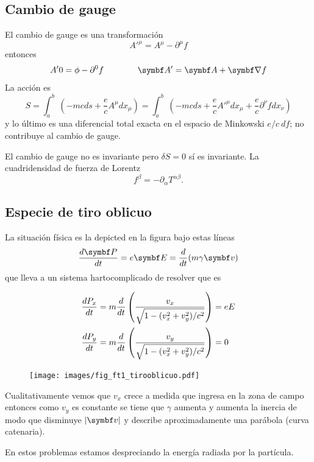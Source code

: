\documentclass[10pt,oneside]{CBFT_book}
\begin{document}
\subsection{Cambio de gauge}

El cambio de gauge es una transformación 
\[
	A'^\mu = A^\mu - \partial^\mu f
\]
entonces 
\[
	A'0 = \phi - \partial^0 f \qquad \qquad \vb{A}' = \vb{A} + \Nabla f
\]
La acción es 
\[
	S = \int_a^b \: \left( - m c ds + \frac{e}{c} A^\mu dx_\mu \right) =
	\int_a^b \: \left( - m c ds + \frac{e}{c} {A'}^\mu dx_\mu + \frac{e}{c} \partial^\nu f dx_\nu \right)
\]
y lo último es una diferencial total exacta en el espacio de Minkowski $e/c \: df$; 
no contribuye al cambio de gauge.

El cambio de gauge no es invariante pero $\delta S = 0$ sí es invariante.
La cuadridensidad de fuerza de Lorentz 
\[
	f^\beta = - \partial_\alpha T^{\alpha\beta}.
\]

\subsection{Especie de tiro oblicuo}

La situación física es la depicted en la figura bajo estas líneas
\[
	\dtot{\vb{P}}{t} = e\vb{E} = \dtot{}{t}( m \gamma \vb{v} )
\]
que lleva a un sistema hartocomplicado de resolver que es 

\begin{align*}
 \frac{d^{\hspace{-0.05em}} {P_x}}{d {t}^{\hspace{-0.05em}}} &= m \frac{d^{\hspace{-0.05em}} {}}{d {t}^{\hspace{-0.05em}}}\left( \frac{v_x}{ \sqrt{ 1 - (v_x^2 + v_y^2)/c^2 } }\right) = eE \\
 \frac{d^{\hspace{-0.05em}} {P_y}}{d {t}^{\hspace{-0.05em}}} &= m \frac{d^{\hspace{-0.05em}} {}}{d {t}^{\hspace{-0.05em}}}\left( \frac{v_y}{ \sqrt{ 1 - (v_x^2 + v_y^2)/c^2 } }\right) =0 \\
\end{align*}


\begin{figure}[htb]
	\begin{center}
	\texttt{[image: images/fig\_ft1\_tirooblicuo.pdf]}	 
	\end{center}
	\caption{}
\end{figure} 

Cualitativamente vemos que $v_x$ crece a medida que ingresa en la zona de campo  entonces como $v_y$ es
constante se tiene que $\gamma$ aumenta y aumenta la inercia de modo que disminuye $|\vb{v}|$ y describe
aproximadamente una parábola (curva catenaria).

En estos problemas estamos despreciando la energía radiada por la partícula.
\end{document}
